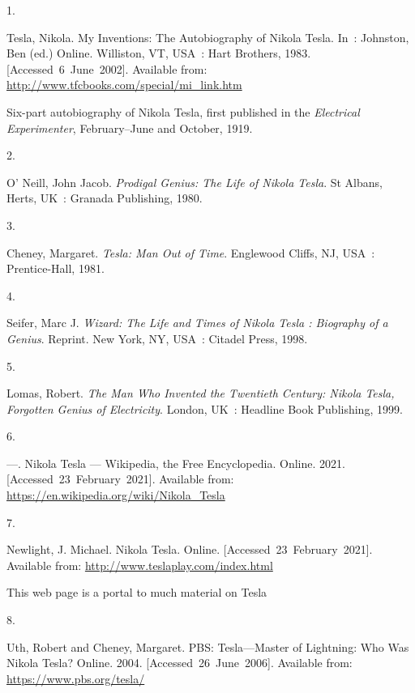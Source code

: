 \documentclass[
  a4paper,
]{article}
\newlength{\cslhangindent}
\newlength{\csllabelwidth}
\newlength{\cslentryspacingunit} %
\newenvironment{CSLReferences}[2] %
 {%
  \setlength{\parindent}{0pt}
  \ifodd #1
  \let\oldpar\par
  \def\par{\hangindent=\cslhangindent\oldpar}
  \fi
  \setlength{\parskip}{#2\cslentryspacingunit}
 }%
 {}
\newcommand{\CSLLeftMargin}[1]{\parbox[t]{\csllabelwidth}{#1}}
\newcommand{\CSLRightInline}[1]{\parbox[t]{\linewidth - \csllabelwidth}{#1}\break}
\begin{document}
\hypertarget{refs}{}
\begin{CSLReferences}{0}{0}
\leavevmode{}%
\CSLLeftMargin{1. }%
\CSLRightInline{Tesla, Nikola. {My Inventions: The Autobiography of
Nikola Tesla}. In~: Johnston, Ben (ed.) Online. Williston, VT, USA~:
Hart Brothers, 1983. {[}Accessed~6~June~2002{]}. Available from:
\url{http://www.tfcbooks.com/special/mi_link.htm}}%
\CSLRightInline{{Six-part autobiography of Nikola Tesla, first published
in the {\emph{Electrical Experimenter}}, February--June and October,
1919.}}

\leavevmode{}%
\CSLLeftMargin{2. }%
\CSLRightInline{O' Neill, John Jacob. \emph{{Prodigal Genius: The Life
of Nikola Tesla}}. St Albans, Herts, UK~: Granada Publishing, 1980. }

\leavevmode{}%
\CSLLeftMargin{3. }%
\CSLRightInline{Cheney, Margaret. \emph{{Tesla: Man Out of Time}}.
Englewood Cliffs, NJ, USA~: Prentice-Hall, 1981. }

\leavevmode{}%
\CSLLeftMargin{4. }%
\CSLRightInline{Seifer, Marc J. \emph{{Wizard: The Life and Times of
Nikola Tesla : Biography of a Genius}}. Reprint. New York, NY, USA~:
Citadel Press, 1998. }

\leavevmode{}%
\CSLLeftMargin{5. }%
\CSLRightInline{Lomas, Robert. \emph{{The Man Who Invented the Twentieth
Century: Nikola Tesla, Forgotten Genius of Electricity}}. London, UK~:
Headline Book Publishing, 1999. }

\leavevmode{}%
\CSLLeftMargin{6. }%
\CSLRightInline{---. {N}ikola {T}esla --- {Wikipedia}{,} the {F}ree
{E}ncyclopedia. Online. 2021. {[}Accessed~23~February~2021{]}. Available
from: \url{https://en.wikipedia.org/wiki/Nikola_Tesla}}

\leavevmode{}%
\CSLLeftMargin{7. }%
\CSLRightInline{Newlight, J. Michael. {Nikola Tesla}. Online.
{[}Accessed~23~February~2021{]}. Available from:
\url{http://www.teslaplay.com/index.html}}%
\CSLRightInline{{This web page is a portal to much material on Tesla}}

\leavevmode{}%
\CSLLeftMargin{8. }%
\CSLRightInline{Uth, Robert and Cheney, Margaret. {PBS: Tesla---Master
of Lightning: Who Was Nikola Tesla?} Online. 2004.
{[}Accessed~26~June~2006{]}. Available from:
\url{https://www.pbs.org/tesla/}}


\end{CSLReferences}
\end{document}
